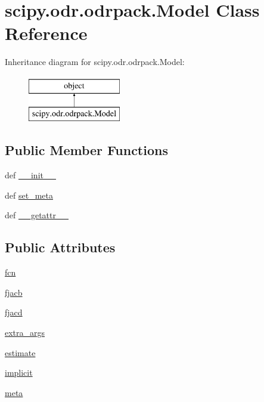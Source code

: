 \hypertarget{classscipy_1_1odr_1_1odrpack_1_1Model}{}\section{scipy.\+odr.\+odrpack.\+Model Class Reference}
\label{classscipy_1_1odr_1_1odrpack_1_1Model}
Inheritance diagram for scipy.\+odr.\+odrpack.\+Model\+:\begin{figure}[H]
\begin{center}
\leavevmode
\includegraphics[height=2.000000cm]{classscipy_1_1odr_1_1odrpack_1_1Model}
\end{center}
\end{figure}
\subsection*{Public Member Functions}
\begin{DoxyCompactItemize}
\item 
def \hyperlink{classscipy_1_1odr_1_1odrpack_1_1Model_a9d2b8040a7e53288926a82b63031f8d3}{\+\_\+\+\_\+init\+\_\+\+\_\+}
\item 
def \hyperlink{classscipy_1_1odr_1_1odrpack_1_1Model_a477bc08ae8c8574ae7321871c27cc276}{set\+\_\+meta}
\item 
def \hyperlink{classscipy_1_1odr_1_1odrpack_1_1Model_ad512b5bd0b7dff88fd85f570b5352679}{\+\_\+\+\_\+getattr\+\_\+\+\_\+}
\end{DoxyCompactItemize}
\subsection*{Public Attributes}
\begin{DoxyCompactItemize}
\item 
\hyperlink{classscipy_1_1odr_1_1odrpack_1_1Model_a48c1f4cff05b1a8ab07e13c1f710bc87}{fcn}
\item 
\hyperlink{classscipy_1_1odr_1_1odrpack_1_1Model_ae46a9876ed3ab953c49cd877404d15b6}{fjacb}
\item 
\hyperlink{classscipy_1_1odr_1_1odrpack_1_1Model_a55950ac3641574221ce1b55d4efd5767}{fjacd}
\item 
\hyperlink{classscipy_1_1odr_1_1odrpack_1_1Model_a172aa4a61504865f1d7948c74cf284aa}{extra\+\_\+args}
\item 
\hyperlink{classscipy_1_1odr_1_1odrpack_1_1Model_a4e5ec57d87e51ce5c4b1379cb13ae81b}{estimate}
\item 
\hyperlink{classscipy_1_1odr_1_1odrpack_1_1Model_af179edbbcdc9cfdfc9d73bf653e21c7c}{implicit}
\item 
\hyperlink{classscipy_1_1odr_1_1odrpack_1_1Model_a6b6148d066bcc85573cc50630d45dd62}{meta}
\end{DoxyCompactItemize}


